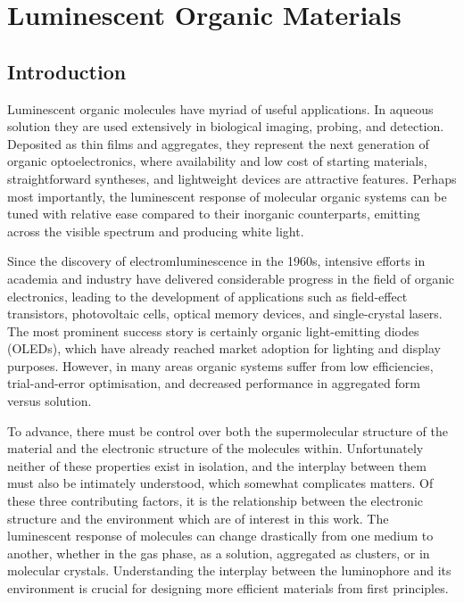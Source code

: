 \chapter{Luminescent Organic Materials}
\label{chapter: luminscent organic materials}
\section{Introduction}\label{section: lom introduction}
Luminescent organic molecules have myriad of useful applications. In aqueous solution they are used extensively in biological imaging, probing, and detection. Deposited as thin films and aggregates, they represent the next generation of organic optoelectronics, where availability and low cost of starting materials, straightforward syntheses, and lightweight devices are attractive features. Perhaps most importantly, the luminescent response of molecular organic systems can be tuned with relative ease compared to their inorganic counterparts, emitting across the visible spectrum and producing white light. 

Since the discovery of electromluminescence in the 1960s, intensive efforts in academia and industry have delivered considerable progress in the field of organic electronics, leading to  the development of applications such as field-effect transistors, photovoltaic cells, optical memory devices, and single-crystal lasers.\cite{Ostroverkhova2016} The most prominent success story is certainly organic light-emitting diodes (OLEDs), which have already reached market adoption for lighting and display purposes. However, in many areas organic systems suffer from low efficiencies, trial-and-error optimisation, and decreased performance in aggregated form versus solution. 

To advance, there must be control over both the supermolecular structure of the material and the electronic structure of the  molecules within.  Unfortunately neither of these properties exist in isolation, and the interplay between them must also be intimately understood, which somewhat complicates matters. Of these three contributing factors, it is the relationship between the electronic structure and the environment which are of interest in this work. The luminescent response of molecules can change drastically from one medium to another, whether in the gas phase, as a solution, aggregated as clusters, or in molecular crystals. Understanding the interplay between the luminophore and its environment is crucial for designing more efficient materials from first principles. 

